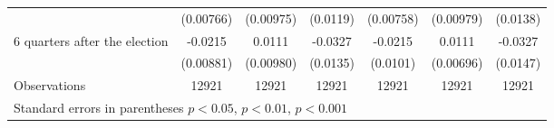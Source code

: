 \begin{table}[!ht]
\begin{tabular}{l*{6}{c}}
                    &   (0.00766)         &   (0.00975)         &    (0.0119)         &   (0.00758)         &   (0.00979)         &    (0.0138)         \\
[0,5em]
 6 quarters after the election&     -0.0215\sym{*}  &      0.0111         &     -0.0327\sym{*}  &     -0.0215\sym{*}  &      0.0111         &     -0.0327\sym{*}  \\
                    &   (0.00881)         &   (0.00980)         &    (0.0135)         &    (0.0101)         &   (0.00696)         &    (0.0147)         \\
\hline
Observations        &       12921         &       12921         &       12921         &       12921         &       12921         &       12921         \\
\hline\hline
\multicolumn{7}{l}{\footnotesize Standard errors in parentheses \sym{*} \(p<0.05\), \sym{**} \(p<0.01\), \sym{***} \(p<0.001\)}\\
\end{tabular}
\end{table}
